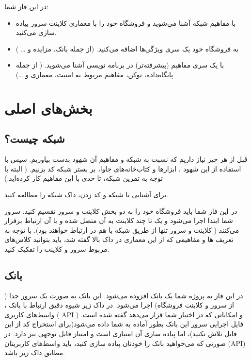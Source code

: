 \documentclass[]{article}
\begin{document}
در این فاز شما:

\begin{itemize}


\item
 با مفاهیم شبکه آشنا می‌شوید و فروشگاه خود را با معماری کلاینت-سرور پیاده سازی می‌کنید.
 
 \item
 
به فروشگاه خود یک سری ویژگی‌ها اضافه می‌کنید. (از جمله بانک، مزایده و … )

\item
با یک سری مفاهیم (پیشرفته‌تر)‌ در برنامه نویسی آشنا می‌شوید. ( از جمله پایگاه‌داده، توکن، مفاهیم مربوط به امنیت، معماری  و …)


\end{itemize}
\newpage
\section*{{\titr بخش‌های اصلی }}

\subsection*{{\titr شبکه چیست؟}}

قبل از هر چیز نیاز داریم که نسبت به شبکه و مفاهیم آن شهود بدست بیاوریم. سپس با استفاده از این شهود ، ابزار‌ها و کتاب‌خانه‌های جاوا، بر بستر شبکه کد بزنیم. ( البته با توجه به تمرین شبکه، تا حدی با این مفاهیم کار کرده‌اید.)


برای آشنایی با شبکه و کد زدن، \textcolor{CustomColor}{داک شبکه} را مطالعه کنید.


در این فاز شما باید فروشگاه خود را به دو بخش کلاینت و سرور تقسیم کنید. سرور شما ابتدا اجرا می‌شود و یک تا چند کلاینت به آن متصل شده و با آن ارتباط برقرار می‌کنند ( کلاینت و سرور تنها از طریق شبکه با هم در ارتباط خواهند بود). با توجه به تعریف ها و مفاهیمی که از این معماری در داک بالا گفته شد، باید  بتوانید کلاس‌های مربوط سرور و کلاینت را تفکیک کنید.



\subsection*{{\titr بانک}}

در این فاز به پروژه شما یک بانک افزوده می‌شود. این بانک به صورت یک سرور جدا ( از سرور و کلاینت فروشگاه‌) اجرا می‌شود. در داک زیر شیوه دقیق ارتباط با بانک ، واسط‌های کاربری  ( API )‌ و امکاناتی که در اختیار شما قرار می‌دهد گفته شده است. فایل اجرایی سرور این بانک بطور آماده به شما داده می‌شود(برای استخراج کد از این فایل تلاش نکنید)، اما پیاده سازی آن امتیازی است و امتیاز قابل توجهی نیز دارد. در صورتی که می‌خواهید بانک را خودتان پیاده سازی کنید، باید واسط‌های کاربریتان (API)‌ مطابق داک زیر باشد.
\end{document}
